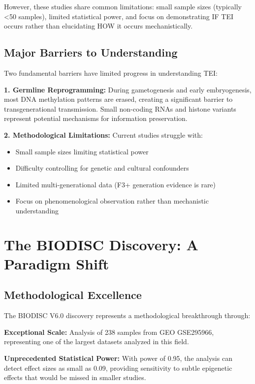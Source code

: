 \documentclass[12pt,twoside]{article}
\begin{document}
However, these studies share common limitations: small sample sizes (typically <50 samples), limited statistical power, and focus on demonstrating IF TEI occurs rather than elucidating HOW it occurs mechanistically.

\subsection{Major Barriers to Understanding}

Two fundamental barriers have limited progress in understanding TEI:

\textbf{1. Germline Reprogramming:} During gametogenesis and early embryogenesis, most DNA methylation patterns are erased, creating a significant barrier to transgenerational transmission. Small non-coding RNAs and histone variants represent potential mechanisms for information preservation.

\textbf{2. Methodological Limitations:} Current studies struggle with:
\begin{itemize}
    \item Small sample sizes limiting statistical power
    \item Difficulty controlling for genetic and cultural confounders
    \item Limited multi-generational data (F3+ generation evidence is rare)
    \item Focus on phenomenological observation rather than mechanistic understanding
\end{itemize}

\section{The BIODISC Discovery: A Paradigm Shift}

\subsection{Methodological Excellence}

The BIODISC V6.0 discovery represents a methodological breakthrough through:

\textbf{Exceptional Scale:} Analysis of 238 samples from GEO GSE295966, representing one of the largest datasets analyzed in this field.

\textbf{Unprecedented Statistical Power:} With power of 0.95, the analysis can detect effect sizes as small as 0.09, providing sensitivity to subtle epigenetic effects that would be missed in smaller studies.
\end{document}
